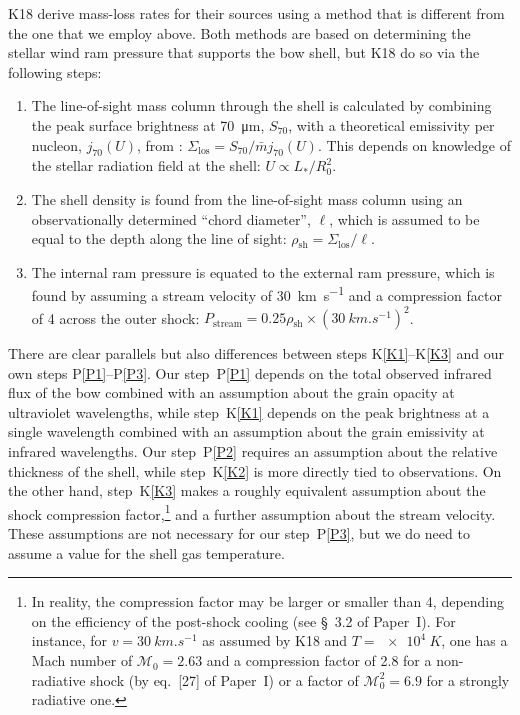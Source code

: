 \documentclass[useAMS, usenatbib, a4paper]{mnras}
\newcommand\shell{\ensuremath{_{\text{sh}}}}
\newcommand\M{\ensuremath{\mathcal{M}}}
\newcommand\LOS{\ensuremath{_{\text{los}}}}
\begin{document}
K18 derive mass-loss rates for their sources using a method that is
different from the one that we employ above.  Both methods are based
on determining the stellar wind ram pressure that supports the bow
shell, but K18 do so via the following steps:
\begin{enumerate}[K1.]
\item \label{K1} The line-of-sight mass column through the shell is
  calculated by combining the peak surface brightness at \SI{70}{\um},
  \(S_{70}\), with a theoretical emissivity per nucleon,
  \(j_{70}(U)\), from \citet{Draine:2007a}:
  \(\Sigma\LOS = S_{70} / \bar{m} j_{70}(U)\).  This depends on
  knowledge of the stellar radiation field at the shell:
  \(U \propto L_* / R_0^2\).
\item \label{K2} The shell density is found from the line-of-sight
  mass column using an observationally determined ``chord diameter'',
  \(\ell\), which is assumed to be equal to the depth along the line
  of sight: \(\rho\shell = \Sigma\LOS / \ell\).
\item \label{K3} The internal ram pressure is equated to the external
  ram pressure, which is found by assuming a stream velocity of
  \SI{30}{km.s^{-1}} and a compression factor of 4 across the outer
  shock:
  \(P_{\text{stream}} = 0.25 \rho\shell \times
  (\SI{30}{km.s^{-1}})^2\).
\end{enumerate}
There are clear parallels but also differences between steps
K\ref{K1}--K\ref{K3} and our own steps P\ref{P1}--P\ref{P3}.  Our
step~P\ref{P1} depends on the total observed infrared flux of the bow
combined with an assumption about the grain opacity at ultraviolet
wavelengths, while step~K\ref{K1} depends on the peak brightness at a
single wavelength combined with an assumption about the grain
emissivity at infrared wavelengths.  Our step~P\ref{P2} requires an
assumption about the relative thickness of the shell, while
step~K\ref{K2} is more directly tied to observations.
On the other hand, step~K\ref{K3} makes a roughly equivalent
assumption about the shock compression factor,\footnote{%
  In reality, the compression factor may be larger or smaller than 4,
  depending on the efficiency of the post-shock cooling (see
  \S~3.2 of Paper~I).  For instance, for \(v = \SI{30}{km.s^{-1}}\) as
  assumed by K18 and \(T = \SI{e4}{K}\), one has a Mach number of
  \(\M_0 = 2.63\) and a compression factor of 2.8 for a non-radiative
  shock (by
  eq.~[27] of Paper~I) or a factor of
  \(\M_0^2 =6.9\) for a strongly radiative one.} %
and a further assumption about the stream velocity. These assumptions
are not necessary for our step~P\ref{P3}, but we do need to assume a
value for the shell gas temperature.
\end{document}
